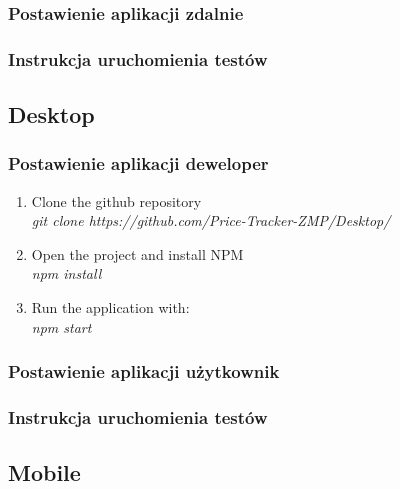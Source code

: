 \documentclass{article}
\begin{document}
        \subsubsection{Postawienie aplikacji zdalnie}
        
        \subsubsection{Instrukcja uruchomienia testów}
        
    \subsection{Desktop}
        \subsubsection{Postawienie aplikacji deweloper}
        \begin{enumerate}
            \item Clone the github repository\\
                        \emph{git clone https://github.com/Price-Tracker-ZMP/Desktop/} \\
            \item Open the project and install NPM\\
              \emph{npm install} \\
            \item Run the application with:\\
                \emph{npm start} \\
        \end{enumerate}
   
        \subsubsection{Postawienie aplikacji użytkownik}
        
        \subsubsection{Instrukcja uruchomienia testów}
        
    \subsection{Mobile}
\end{document}
